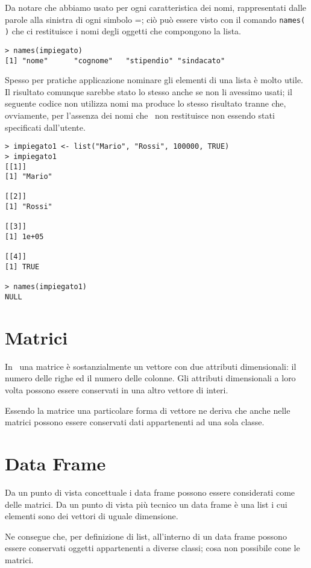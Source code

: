 Da notare che abbiamo usato per ogni caratteristica dei nomi, rappresentati dalle parole alla sinistra di ogni simbolo =; ciò può essere visto con il comando \lstinline!names( )! che ci restituisce i nomi degli oggetti che compongono la lista.
\begin{lstlisting}
> names(impiegato)
[1] "nome"      "cognome"   "stipendio" "sindacato"
\end{lstlisting}

Spesso per pratiche applicazione nominare gli elementi di una lista è molto utile. Il risultato comunque sarebbe stato lo stesso anche se non li avessimo usati; il seguente codice non utilizza nomi ma produce lo stesso risultato tranne che, ovviamente, per l'assenza dei nomi che \erre\ non restituisce non essendo stati specificati dall'utente.
\begin{lstlisting}
> impiegato1 <- list("Mario", "Rossi", 100000, TRUE)
> impiegato1
[[1]]
[1] "Mario"

[[2]]
[1] "Rossi"

[[3]]
[1] 1e+05

[[4]]
[1] TRUE

> names(impiegato1)
NULL
\end{lstlisting}

\section{Matrici}

In \erre\ una matrice è sostanzialmente un vettore con due attributi dimensionali: il numero delle righe ed il numero delle colonne. Gli attributi dimensionali a loro volta possono essere conservati in una altro vettore di interi.

Essendo la matrice una particolare forma di vettore ne deriva che anche nelle matrici possono essere conservati dati appartenenti ad una sola classe.

\section{Data Frame}

Da un punto di vista concettuale i data frame possono essere considerati come delle matrici. Da un punto di vista più tecnico un data frame è una list i cui elementi sono dei vettori di uguale dimensione.

Ne consegue che, per definizione di list, all'interno di un data frame possono essere conservati oggetti appartenenti a diverse classi; cosa non possibile cone le matrici.


